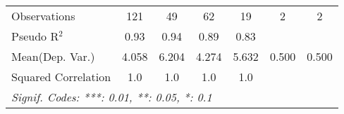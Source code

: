 \begin{tabular}{lcccccc}
   Observations                                               & 121          & 49          & 62             & 19           & 2    & 2\\  
   Pseudo R$^2$                                               & 0.93         & 0.94        & 0.89           & 0.83         &      & \\  
Mean(Dep. Var.) & 4.058 & 6.204 & 4.274 & 5.632 & 0.500 & 0.500 \\
   Squared Correlation                                        & 1.0          & 1.0         & 1.0            & 1.0          &      & \\  
   \midrule \midrule
   \multicolumn{7}{l}{\emph{Signif. Codes: ***: 0.01, **: 0.05, *: 0.1}}\\
\end{tabular}
\par\endgroup
